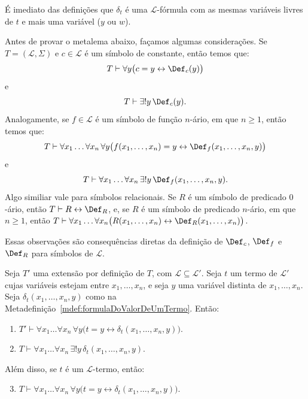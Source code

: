 É imediato das definições que $\delta_t$ é uma $\mathcal L$-fórmula com as mesmas variáveis livres de $t$ e mais uma variável ($y$ ou $w$).

Antes de provar o metalema abaixo, façamos algumas considerações.
Se $T=(\mathcal L, \Sigma)$ e $c \in \mathcal L$ é um símbolo de constante, então temos que:
\[
    T\vdash \forall y\bigl(c=y \leftrightarrow \Def_c(y)\bigr)
\]
e
\[
    T\vdash \exists!y\,\Def_c(y).
\]
Analogamente, se $f \in \mathcal L$ é um símbolo de função $n$-ário, em que $n \geq 1$, então temos que:
\[
    T\vdash \forall x_1\ldots \forall x_n\,\forall y\bigl(f(x_1,\ldots,x_n)=y \leftrightarrow \Def_f(x_1,\ldots,x_n,y)\bigr)
\]
e
\[
    T\vdash \forall x_1\ldots \forall x_n\,\exists!y\,\Def_f(x_1,\ldots,x_n,y).
\]
Algo similiar vale para símbolos relacionais.
Se $R$ é um símbolo de predicado $0$-ário, então $T\vdash R\leftrightarrow \Def_R$, e, se $R$ é um símbolo de predicado $n$-ário, em que $n\geq 1$, então $T\vdash \forall x_1\ldots \forall x_n\bigl(R(x_1,\ldots,x_n)\leftrightarrow \Def_R(x_1,\ldots,x_n)\bigr)$.

Essas observações são consequências diretas da definição de $\Def_c$, $\Def_f$ e $\Def_R$ para símbolos de $\mathcal L$.

\begin{metalemma}\label{mlem:eliminacaoDeTermos}
    Seja $T'$ uma extensão por definição de $T$, com $\mathcal L\subseteq \mathcal L'$.
    Seja $t$ um termo de $\mathcal L'$ cujas variáveis estejam entre $x_1,\ldots,x_n$,
    e seja $y$ uma variável distinta de $x_1,\ldots,x_n$.
    Seja $\delta_t(x_1,\ldots,x_n,y)$ como na Metadefinição~\ref{mdef:formulaDoValorDeUmTermo}. Então:
    \begin{enumerate}[label=(\arabic*)]
        \item $T'\vdash \forall x_1\ldots \forall x_n\,\forall y\bigl(t=y \leftrightarrow \delta_t(x_1,\ldots,x_n,y)\bigr)$.
        \item $T\vdash \forall x_1\ldots \forall x_n\,\exists!y\,\delta_t(x_1,\ldots,x_n,y)$.
    \end{enumerate}

    Além disso, se $t$ é um $\mathcal L$-termo, então:
    \begin{enumerate}[label=(\arabic*)]
        \setcounter{enumi}{2}
        \item $T\vdash \forall x_1\ldots \forall x_n\,\forall y\bigl(t=y \leftrightarrow \delta_t(x_1,\ldots,x_n,y)\bigr)$.
    \end{enumerate}
\end{metalemma}

